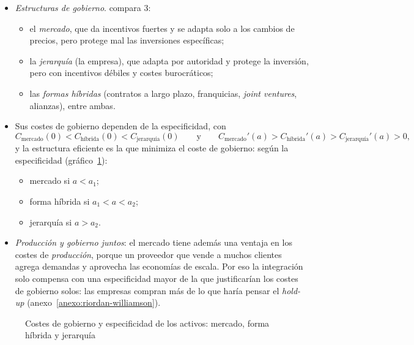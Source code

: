 \documentclass[11pt]{article}
\begin{document}
\begin{itemize}
\item \emph{Estructuras de gobierno}. \textcite{Williamson1991Comparative} compara 3:
  \begin{itemize}
  \item el \emph{mercado}, que da incentivos fuertes y se adapta solo a los cambios de precios, pero protege mal las inversiones específicas;
  \item la \emph{jerarquía} (la empresa), que adapta por autoridad y protege la inversión, pero con incentivos débiles y costes burocráticos;
  \item las \emph{formas híbridas} (contratos a largo plazo, franquicias, \emph{joint ventures}, alianzas), entre ambas.
  \end{itemize}
\item Sus costes de gobierno dependen de la especificidad, con
  \[
  C_{\text{mercado}}(0)<C_{\text{híbrida}}(0)<C_{\text{jerarquía}}(0)\qquad\text{y}\qquad C_{\text{mercado}}'(a)>C_{\text{híbrida}}'(a)>C_{\text{jerarquía}}'(a)>0,
  \]
  y la estructura eficiente es la que minimiza el coste de gobierno:
  según la especificidad (gráfico~\ref{fig:gobierno-williamson}):
  \begin{itemize}
  \item mercado si $a<a_1$;
  \item forma híbrida si $a_1<a<a_2$;
  \item jerarquía si $a>a_2$.
  \end{itemize}
\item \emph{Producción y gobierno juntos}: el mercado tiene además una ventaja en los costes de \emph{producción}, porque un proveedor que vende a muchos clientes agrega demandas y aprovecha las economías de escala. Por eso la integración solo compensa con una especificidad mayor de la que justificarían los costes de gobierno solos: las empresas compran más de lo que haría pensar el \emph{hold-up}\nocite{RiordanWilliamson1985Asset} (anexo~\ref{anexo:riordan-williamson}).
\end{itemize}

\begin{figure}[H]
\centering
\caption{Costes de gobierno y especificidad de los activos: mercado, forma híbrida y jerarquía}\label{fig:gobierno-williamson}
\end{figure}
\end{document}
